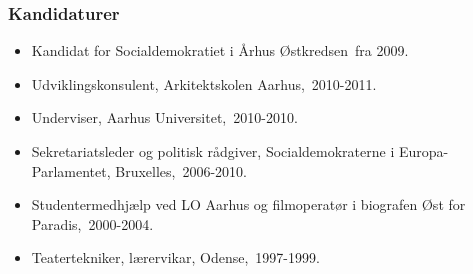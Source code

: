 \documentclass[11pt, a4paper]{awesome-cv}
\begin{document}
\begin{cvletter}
\subsubsection*{Kandidaturer}
\begin{itemize}
\item Kandidat for Socialdemokratiet i Århus Østkredsen fra 2009.
\end{itemize}
\begin{itemize}
\item Udviklingskonsulent, Arkitektskolen Aarhus, 2010-2011.
\item Underviser, Aarhus Universitet, 2010-2010.
\item Sekretariatsleder og politisk rådgiver, Socialdemokraterne i Europa-Parlamentet, Bruxelles, 2006-2010.
\item Studentermedhjælp ved LO Aarhus og filmoperatør i biografen Øst for Paradis, 2000-2004.
\item Teatertekniker, lærervikar, Odense, 1997-1999.
\end{itemize}
\end{cvletter}
\end{document}
